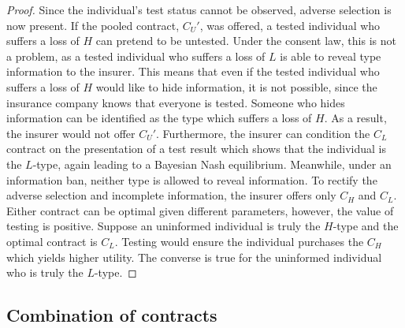 \documentclass[natbib=false,preprint,12pt]{elsarticle}
\theoremstyle{plain}
\theoremstyle{definition}
\theoremstyle{plain}
\theoremstyle{TheoremNum}
\theoremstyle{CorollaryNum}
\theoremstyle{PropositionNum}
\theoremstyle{TheoremNum}
\begin{document}
\begin{proof}
Since the individual's test status cannot be observed, adverse selection is now present. If the pooled contract, $C_U'$, was offered, a tested individual who suffers a loss of $H$ can pretend to be untested. Under the consent law, this is not a problem, as a tested individual who suffers a loss of $L$ is able to reveal type information to the insurer. This means that even if the tested individual who suffers a loss of $H$ would like to hide information, it is not possible, since the insurance company knows that everyone is tested. Someone who hides information can be identified as the type which suffers a loss of $H$. As a result, the insurer would not offer $C_U'$. Furthermore, the insurer can condition the $C_L$ contract on the presentation of a test result which shows that the individual is the $L$-type, again leading to a Bayesian Nash equilibrium. Meanwhile, under an information ban, neither type is allowed to reveal information. To rectify the adverse selection and incomplete information, the insurer offers only $C_H$ and $C_L$. Either contract can be optimal given different parameters, however, the value of testing is positive. Suppose an uninformed individual is truly the $H$-type and the optimal contract is $C_L$. Testing would ensure the individual purchases the $C_H$ which yields higher utility. The converse is true for the uninformed individual who is truly the $L$-type. 
\end{proof}


\subsection{Combination of contracts}
\end{document}

